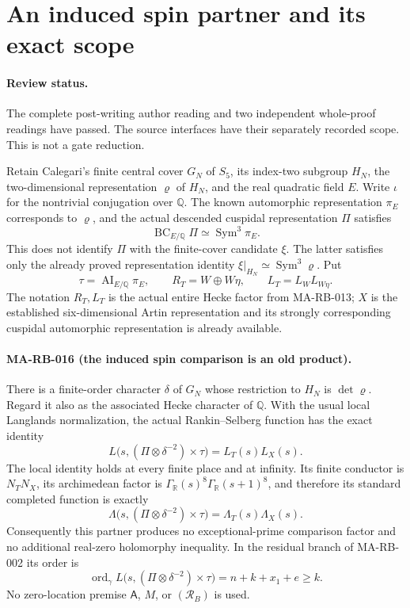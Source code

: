 \section{An induced spin partner and its exact scope}
\label{sec:s5-induced-spin-scope}

\paragraph{Review status.}
The complete post-writing author reading and two independent
whole-proof readings have passed. The source interfaces have
their separately recorded scope. This is not a gate reduction.

Retain Calegari's finite central cover \(G_N\) of \(S_5\),
its index-two subgroup \(H_N\), the two-dimensional
representation \(\varrho\) of \(H_N\), and the real
quadratic field \(E\). Write \(\iota\) for the nontrivial
conjugation over \(\mathbb Q\). The known automorphic
representation \(\pi_E\) corresponds to \(\varrho\),
and the actual descended cuspidal representation \(\Pi\)
satisfies
\[
 \operatorname{BC}_{E/\mathbb Q}\Pi
       \simeq\operatorname{Sym}^3\pi_E.
 \tag{MA-RB.310}
\]
This does not identify \(\Pi\) with the finite-cover
candidate \(\xi\). The latter satisfies only the already
proved representation identity
\(\xi|_{H_N}\simeq\operatorname{Sym}^3\varrho\).
Put
\[
 \tau=\operatorname{AI}_{E/\mathbb Q}\pi_E,
 \qquad R_T=W\oplus W\eta,
 \qquad L_T=L_WL_{W\eta}.
 \tag{MA-RB.311}
\]
The notation \(R_T,L_T\) is the actual entire Hecke factor
from MA-RB-013; \(X\) is the established six-dimensional
Artin representation and its strongly corresponding
cuspidal automorphic representation is already available.

\paragraph{MA-RB-016 (the induced spin comparison is an old product).}
There is a finite-order character \(\delta\) of \(G_N\)
whose restriction to \(H_N\) is \(\det\varrho\).
Regard it also as the associated Hecke character of
\(\mathbb Q\). With the usual local Langlands normalization,
the actual Rankin--Selberg function has the exact identity
\[
 L\bigl(s,(\Pi\otimes\delta^{-2})\times\tau\bigr)
                         =L_T(s)L_X(s).
 \tag{MA-RB.312}
\]
The local identity holds at every finite place and at infinity.
Its finite conductor is \(N_TN_X\),
its archimedean factor is
\(\Gamma_{\mathbb R}(s)^8\Gamma_{\mathbb R}(s+1)^8\),
and therefore its standard completed function is exactly
\[
 \Lambda\bigl(s,(\Pi\otimes\delta^{-2})\times\tau\bigr)
                         =\Lambda_T(s)\Lambda_X(s).
 \tag{MA-RB.313}
\]
Consequently this partner produces no exceptional-prime
comparison factor and no additional real-zero holomorphy
inequality. In the residual branch of MA-RB-002 its order is
\[
 \operatorname{ord}_{\gamma}
     L\bigl(s,(\Pi\otimes\delta^{-2})\times\tau\bigr)
                       =n+k+x_1+e\ge k.
 \tag{MA-RB.314}
\]
No zero-location premise \(\mathsf A\), \(M\), or
\((\mathcal R_B)\) is used.

